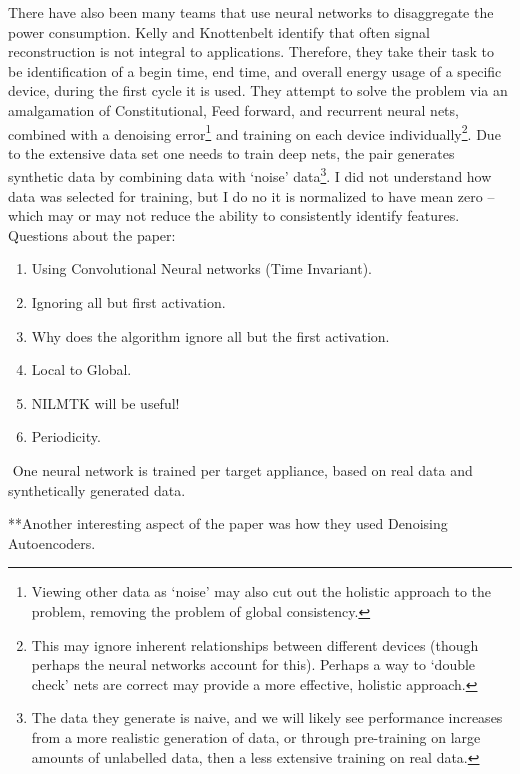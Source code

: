 \documentclass{article}
\begin{document}
There have also been many teams that use neural networks to disaggregate the power consumption. 
Kelly and Knottenbelt identify that often signal reconstruction is not integral to applications.
Therefore, they take their task to be identification of a begin time, end time, and overall energy usage of a specific device, during the first cycle it is used.
They attempt to solve the problem via an amalgamation of Constitutional, Feed forward, and recurrent neural nets, combined with a denoising error\footnote{Viewing other data as `noise' may also cut out the holistic approach to the problem, removing the problem of global consistency.} and training on each device individually\footnote{This may ignore inherent relationships between different devices (though perhaps the neural networks account for this).
Perhaps a way to `double check' nets are correct may provide a more effective, holistic approach.}.
Due to the extensive data set one needs to train deep nets, the pair generates synthetic data by combining data with `noise' data\footnote{The data they generate is naive, and we will likely see performance increases from a more realistic generation of data, or through pre-training on large amounts of unlabelled data, then a less extensive training on real data.}.
I did not understand how data was selected for training, but I do no it is normalized to have mean zero -- which may or may not reduce the ability to consistently identify features.
​
Questions about the paper:
%
\begin{enumerate}
	\item Using Convolutional Neural networks (Time Invariant).
	\item Ignoring all but first activation.
	\item Why does the algorithm ignore all but the first activation.
	\item Local to Global.
	\item NILMTK will be useful!
	\item Periodicity.
\end{enumerate}
​
One neural network is trained per target appliance, based on real data and synthetically generated data.

**Another interesting aspect of the paper was how they used Denoising Autoencoders.
​
\end{document}
